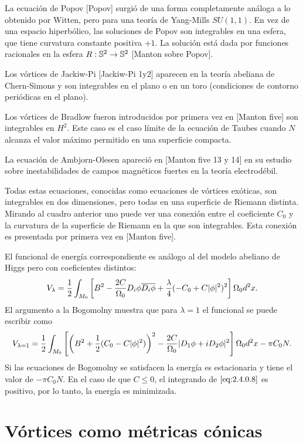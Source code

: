 La ecuación de Popov [Popov] surgió de una forma completamente análoga a lo obtenido por Witten, pero para una teoría de Yang-Mills $SU(1,1)$. En vez de una espacio hiperbólico, las soluciones de Popov son integrables en una esfera, que tiene curvatura constante positiva $+1$. La solución está dada por funciones racionales en la esfera $R:\mathbb{S}^2\rightarrow\mathbb{S}^2$ [Manton sobre Popov].

Los vórtices de Jackiw-Pi [Jackiw-Pi 1y2] aparecen en la teoría abeliana de Chern-Simons y son integrables en el plano o en un toro (condiciones de contorno periódicas en el plano).

Los vórtices de Bradlow fueron introducidos por primera vez en [Manton five] son integrables en $H^2$. Este caso es el caso límite de la ecuación de Taubes cuando $N$ alcanza el valor máximo permitido en una superficie compacta.

La ecuación de Ambjorn-Olesen apareció en [Manton five 13 y 14] en su estudio sobre inestabilidades de campos magnéticos fuertes en la teoría electrodébil.

Todas estas ecuaciones, conocidas como ecuaciones de vórtices exóticas, son integrables en dos dimensiones, pero todas en una superficie de Riemann distinta. Mirando al cuadro anterior uno puede ver una conexión entre el coeficiente $C_0$ y la curvatura de la superficie de Riemann en la que son integrables. Esta conexión es presentada por primera vez en [Manton five].


El funcional de energía correspondiente es análogo al del modelo abeliano de Higgs pero con coeficientes distintos:
\begin{align}
    V_{\lambda} = \frac{1}{2}\int_{M_0}\left[B^2-\frac{2C}{\Omega_0}D_i\phi\overline{D_i\phi}+\frac{\lambda}{4}(-C_0+C|\phi|^2)^2\right]\Omega_0 d^2x. \label{eq:2.4.0.7}
\end{align}
El argumento a la Bogomolny muestra que para $\lambda=1$ el funcional se puede escribir como
\begin{align}
    V_{\lambda=1} = \frac{1}{2}\int_{M_0}\left[\left(B^2+\frac{1}{2}(C_0-C|\phi|^2)\right)^2-\frac{2C}{\Omega_0}|D_1\phi+iD_2\phi|^2\right]\Omega_0 d^2x-\pi C_0 N. \label{eq:2.4.0.8}
\end{align}
Si las ecuaciones de Bogomolny se satisfacen la energía es estacionaria y tiene el valor de $-\pi C_0 N$. En el caso de que $C\leq 0$, el integrando de $\eqref{eq:2.4.0.8}$ es positivo, por lo tanto, la energía es minimizada.

\section{Vórtices como métricas cónicas}
\label{sec:conic}

